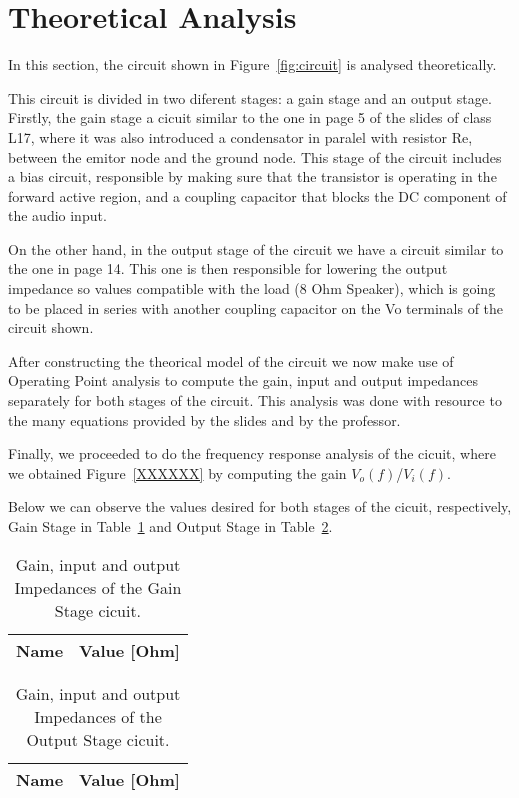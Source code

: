 \section{Theoretical Analysis}
\label{sec:analysis}
\tab In this section, the circuit shown in Figure~\ref{fig:circuit} is analysed theoretically.

This circuit is divided in two diferent stages: a gain stage and an output stage. Firstly, the gain stage a cicuit similar to the one in page 5 of the slides of class L17, where it was also introduced a condensator in paralel with resistor Re, between the emitor node and the ground node. This stage of the circuit includes a bias circuit, responsible by making sure that the transistor is operating in the forward active region, and a coupling capacitor that blocks the DC component of the audio input.

On the other hand, in the output stage of the circuit we have a circuit similar to the one in page 14. This one is then responsible for lowering the output impedance so values compatible with the load (8 Ohm Speaker), which is going to be placed in series with another coupling capacitor on the Vo terminals of the circuit shown.

After constructing the theorical model of the circuit we now make use of Operating Point analysis to compute the gain, input and output impedances separately for both stages of the circuit. This analysis was done with resource to the many equations provided by the slides and by the professor.

Finally, we proceeded to do the frequency response analysis of the cicuit, where we obtained Figure~\ref{XXXXXX} by computing the gain $V_o(f)$/$V_i(f)$.

Below we can observe the values desired for both stages of the cicuit, respectively, Gain Stage in Table~\ref{tab:gain} and Output Stage in Table~\ref{tab:output}.

\begin{table}[H]
  \centering
  \begin{tabular}{|l|r|}
    \hline    
    {\bf Name} & {\bf Value [Ohm]} \\ \hline
	
  \end{tabular}
  \caption{Gain, input and output Impedances of the Gain Stage cicuit.}
  \label{tab:gain}
\end{table}

\begin{table}[H]
  \centering
  \begin{tabular}{|l|r|}
    \hline    
    {\bf Name} & {\bf Value [Ohm]} \\ \hline
	
  \end{tabular}
  \caption{Gain, input and output Impedances of the Output Stage cicuit.}
  \label{tab:output}
\end{table}

